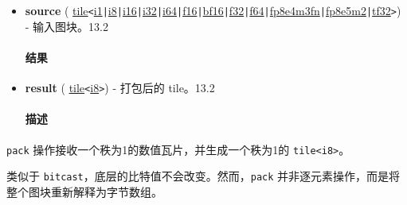 \documentclass{article}
\begin{document}
\begin{itemize}
\item \textbf{source} ( \href{https://docs.nvidia.com/cuda/tile-ir/latest/sections/types.html#type-tile}{tile}\texttt{<}\href{https://docs.nvidia.com/cuda/tile-ir/latest/sections/types.html#subsection-element-types}{i1}\texttt{|}\href{https://docs.nvidia.com/cuda/tile-ir/latest/sections/types.html#subsection-element-types}{i8}\texttt{|}\href{https://docs.nvidia.com/cuda/tile-ir/latest/sections/types.html#subsection-element-types}{i16}\texttt{|}\href{https://docs.nvidia.com/cuda/tile-ir/latest/sections/types.html#subsection-element-types}{i32}\texttt{|}\href{https://docs.nvidia.com/cuda/tile-ir/latest/sections/types.html#subsection-element-types}{i64}\texttt{|}\href{https://docs.nvidia.com/cuda/tile-ir/latest/sections/types.html#subsection-element-types}{f16}\texttt{|}\href{https://docs.nvidia.com/cuda/tile-ir/latest/sections/types.html#subsection-element-types}{bf16}\texttt{|}\href{https://docs.nvidia.com/cuda/tile-ir/latest/sections/types.html#subsection-element-types}{f32}\texttt{|}\href{https://docs.nvidia.com/cuda/tile-ir/latest/sections/types.html#subsection-element-types}{f64}\texttt{|}\href{https://docs.nvidia.com/cuda/tile-ir/latest/sections/types.html#subsection-element-types}{fp8e4m3fn}\texttt{|}\href{https://docs.nvidia.com/cuda/tile-ir/latest/sections/types.html#subsection-element-types}{fp8e5m2}\texttt{|}\href{https://docs.nvidia.com/cuda/tile-ir/latest/sections/types.html#subsection-element-types}{tf32}\texttt{>}) - 输入图块。13.2


\paragraph{结果}

\item \textbf{result} ( \href{https://docs.nvidia.com/cuda/tile-ir/latest/sections/types.html#type-tile}{tile}\texttt{<}\href{https://docs.nvidia.com/cuda/tile-ir/latest/sections/types.html#subsection-element-types}{i8}\texttt{>}) - 打包后的 tile。13.2


\paragraph{描述}

\end{itemize}
\texttt{pack} 操作接收一个秩为1的数值瓦片，并生成一个秩为1的 \texttt{tile<i8>}。


类似于 \texttt{bitcast}，底层的比特值不会改变。然而，\texttt{pack} 并非逐元素操作，而是将整个图块重新解释为字节数组。
\end{document}
